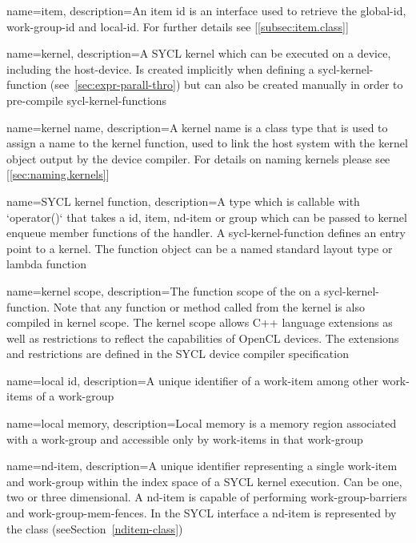 {
  name={item},
  description={An item id is an interface used to retrieve the \gls{global-id},
        \gls{work-group-id} and \gls{local-id}. For further details see
              [\ref{subsec:item.class}]}
}

{
  name=kernel,
  description={A SYCL kernel which can be executed on a \gls{device},
  including the \gls{host-device}. Is created implicitly when defining a
  \gls{sycl-kernel-function} (see~\ref{sec:expr-parall-thro}) but can also be
  created manually in order to pre-compile \glspl{sycl-kernel-function}}
}

{
  name={kernel name},
  description={A kernel name is a class type that is used to assign a name to
               the kernel function, used to link the host system with the
               kernel object output by the device compiler. For details on naming
               kernels please see [\ref{sec:naming.kernels}]}
}

{
  name={SYCL kernel function},
  description={A type which is callable with `operator()` that takes a \gls{id},
  \gls{item}, \gls{nd-item} or \gls{group} which can be passed to kernel
  enqueue member functions of the \gls{handler}. A \gls{sycl-kernel-function}
  defines an entry point to a \gls{kernel}. The function object can be a named
  standard layout type or lambda function}
}

{
  name={kernel scope},
  description={The function scope of the  on a \gls{sycl-kernel-function}. Note
               that any function or method called from the kernel is also
               compiled in kernel scope. The kernel scope allows C++ language
               extensions as well as restrictions to reflect the capabilities of
               OpenCL devices. The extensions and restrictions are defined in
               the SYCL device compiler specification}
}

{
  name={local id},
  description={A unique identifier of a work-item among other work-items of a
               work-group}
}

{
  name={local memory},
  description={Local memory is a memory region associated with a work-group
               and accessible only by work-items in that work-group}
}

{
  name={nd-item},
  description={A unique identifier representing a single \gls{work-item} and
  \gls{work-group} within the index space of a SYCL kernel execution. Can be
  one, two or three dimensional. A \gls{nd-item} is capable of performing
  \glspl{work-group-barrier} and \glspl{work-group-mem-fence}. In the SYCL
  interface a \gls{nd-item} is represented by the  class
  (seeSection~\ref{nditem-class})}
}

